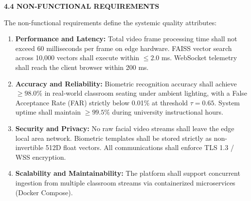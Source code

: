 \vspace{0.2in}
\begin{flushleft}
{\fontsize{14pt}{18pt}\selectfont \textbf{4.4 NON-FUNCTIONAL REQUIREMENTS}}\\[2mm]
\end{flushleft}

\noindent The non-functional requirements define the systemic quality attributes:
\begin{enumerate}
    \item \textbf{Performance and Latency:} Total video frame processing time shall not exceed 60 milliseconds per frame on edge hardware. FAISS vector search across 10,000 vectors shall execute within $\le 2.0$ ms. WebSocket telemetry shall reach the client browser within 200 ms.
    \item \textbf{Accuracy and Reliability:} Biometric recognition accuracy shall achieve $\ge 98.0\%$ in real-world classroom seating under ambient lighting, with a False Acceptance Rate (FAR) strictly below 0.01\% at threshold $\tau = 0.65$. System uptime shall maintain $\ge 99.5\%$ during university instructional hours.
    \item \textbf{Security and Privacy:} No raw facial video streams shall leave the edge local area network. Biometric templates shall be stored strictly as non-invertible 512D float vectors. All communications shall enforce TLS 1.3 / WSS encryption.
    \item \textbf{Scalability and Maintainability:} The platform shall support concurrent ingestion from multiple classroom streams via containerized microservices (Docker Compose).
\end{enumerate}
\newpage
